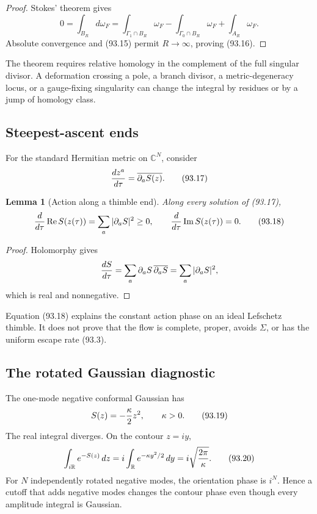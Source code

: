 \documentclass[11pt]{article}
\newtheorem{lemma}[theorem]{Lemma}
\begin{document}
\begin{proof}
Stokes' theorem gives
\[
 0=\int_{B_R}d\omega_F
  =\int_{\Gamma_1\cap B_R}\omega_F
   -\int_{\Gamma_0\cap B_R}\omega_F+\int_{A_R}\omega_F.
\]
Absolute convergence and (93.15) permit \(R\to\infty\), proving
(93.16).
\end{proof}

The theorem requires relative homology in the complement of the full
singular divisor.  A deformation crossing a pole, a branch divisor,
a metric-degeneracy locus, or a gauge-fixing singularity can change
the integral by residues or by a jump of homology class.

\subsection{Steepest-ascent ends}

For the standard Hermitian metric on \(\mathbb C^N\), consider
\[
                              {dz^a\over d\tau}
                              =\overline{\partial_aS(z)}.     \tag{93.17}
\]

\begin{lemma}[Action along a thimble end]
\label{lem:v11v93-flow}
Along every solution of (93.17),
\[
 {d\over d\tau}\operatorname{Re}S(z(\tau))
             =\sum_a|\partial_aS|^2\ge0,\qquad
 {d\over d\tau}\operatorname{Im}S(z(\tau))=0.               \tag{93.18}
\]
\end{lemma}

\begin{proof}
Holomorphy gives
\[
 {dS\over d\tau}
 =\sum_a\partial_aS\,\overline{\partial_aS}
 =\sum_a|\partial_aS|^2,
\]
which is real and nonnegative.
\end{proof}

Equation (93.18) explains the constant action phase on an ideal
Lefschetz thimble.  It does not prove that the flow is complete,
proper, avoids \(\Sigma\), or has the uniform escape rate (93.3).

\subsection{The rotated Gaussian diagnostic}

The one-mode negative conformal Gaussian has
\[
                              S(z)=-{\kappa\over2}z^2,
                       \qquad \kappa>0.                     \tag{93.19}
\]
The real integral diverges.  On the contour \(z=iy\),
\[
 \int_{i\mathbb R}e^{-S(z)}\,dz
 =i\int_{\mathbb R}e^{-\kappa y^2/2}\,dy
 =i\sqrt{2\pi\over\kappa}.                                  \tag{93.20}
\]
For \(N\) independently rotated negative modes, the orientation phase
is \(i^N\).  Hence a cutoff that adds negative modes changes the
contour phase even though every amplitude integral is Gaussian.
\end{document}
